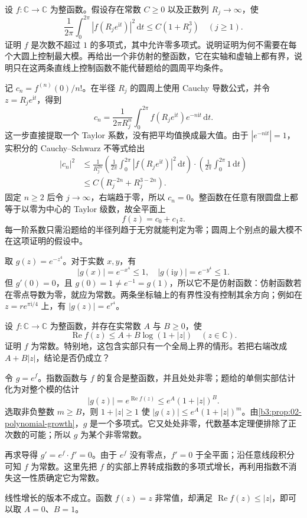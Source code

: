 \begin{exercise}\label{b3:ex:02-3}
设 \(f:\mathbb C\rightarrow\mathbb C\) 为整函数。假设存在常数 \(C\ge0\) 以及正数列 \(R_j\to\infty\)，使
\[
  \frac1{2\pi}\int_0^{2\pi}|f(R_je^{\mathrm{i}t})|^2\,\mathrm{d}t
  \le C(1+R_j^3)\quad(j\ge1).
\]
证明 \(f\) 是次数不超过 \(1\) 的多项式，其中允许零多项式。说明证明为何不需要在每个大圆上控制最大模。再给出一个非仿射的整函数，它在实轴和虚轴上都有界，说明只在这两条直线上控制函数不能代替题给的圆周平均条件。
\end{exercise}
\begin{solution}
记 \(c_n=f^{(n)}(0)/n!\)。在半径 \(R_j\) 的圆周上使用 Cauchy 导数公式，并令 \(z=R_je^{\mathrm{i}t}\)，得到
\[
  c_n=\frac1{2\pi R_j^n}
        \int_0^{2\pi}f(R_je^{\mathrm{i}t})e^{-n\mathrm{i}t}\,\mathrm{d}t.
\]
这一步直接提取一个 Taylor 系数，没有把平均值换成最大值。由于 \(|e^{-n\mathrm{i}t}|=1\)，实积分的 Cauchy--Schwarz 不等式给出
\[
\begin{aligned}
  |c_n|^2
  &\le\frac1{R_j^{2n}}
       \left(\frac1{2\pi}\int_0^{2\pi}
                |f(R_je^{\mathrm{i}t})|^2\,\mathrm{d}t\right)\cdot
       \left(\frac1{2\pi}\int_0^{2\pi}1\,\mathrm{d}t\right)\\
  &\le C\left(R_j^{-2n}+R_j^{3-2n}\right).
\end{aligned}
\]
固定 \(n\ge2\) 后令 \(j\to\infty\)，右端趋于零，所以 \(c_n=0\)。整函数在任意有限圆盘上都等于以零为中心的 Taylor 级数，故全平面上
\[
  f(z)=c_0+c_1z.
\]
每一阶系数只需沿题给的半径列趋于无穷就能判定为零；圆周上个别点的最大模不在这项证明的假设中。

取 \(g(z)=e^{-z^4}\)。对于实数 \(x,y\)，有
\[
  |g(x)|=e^{-x^4}\le1,
  \quad |g(\mathrm{i}y)|=e^{-y^4}\le1.
\]
但 \(g'(0)=0\)，且 \(g(0)=1\ne e^{-1}=g(1)\)，所以它不是仿射函数：仿射函数若在零点导数为零，就应为常数。两条坐标轴上的有界性没有控制其余方向；例如在 \(z=re^{\pi\mathrm{i}/4}\) 上，有 \(|g(z)|=e^{r^4}\)。
\end{solution}

\begin{exercise}\label{b3:ex:02-4}
设 \(f:\mathbb C\rightarrow\mathbb C\) 为整函数，并存在实常数 \(A\) 与 \(B\ge0\)，使
\[
  \operatorname{Re}f(z)\le A+B\log(1+|z|)
  \quad(z\in\mathbb C).
\]
证明 \(f\) 为常数。特别地，这包含实部只有一个全局上界的情形。若把右端改成 \(A+B|z|\)，结论是否仍成立？
\end{exercise}
\begin{solution}
令 \(g=e^f\)。指数函数与 \(f\) 的复合是整函数，并且处处非零；题给的单侧实部估计化为对整个模的估计
\[
  |g(z)|=e^{\operatorname{Re}f(z)}
  \le e^A(1+|z|)^B.
\]
选取非负整数 \(m\ge B\)，则 \(1+|z|\ge1\) 使
\(|g(z)|\le e^A(1+|z|)^m\)。由\cref{b3:prop:02-polynomial-growth}，\(g\) 是一个多项式。它又处处非零，代数基本定理便排除了正次数的可能；所以 \(g\) 为某个非零常数。

再求导得 \(g'=e^f\cdot f'=0\)。由于 \(e^f\) 没有零点，\(f'=0\) 于全平面；沿任意线段积分可知 \(f\) 为常数。这里先把 \(f\) 的实部上界转成指数的多项式增长，再利用指数不消失这一性质确定它为常数。

线性增长的版本不成立。函数 \(f(z)=z\) 非常值，却满足
\(\operatorname{Re}f(z)\le|z|\)，即可以取 \(A=0\)、\(B=1\)。
\end{solution}

